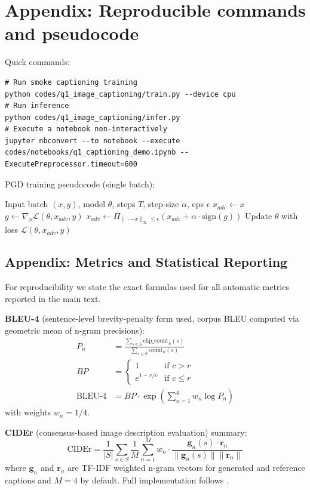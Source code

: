 \documentclass[conference]{IEEEtran}
\begin{document}
\section{Appendix: Reproducible commands and pseudocode}
Quick commands:
\begin{lstlisting}
# Run smoke captioning training
python codes/q1_image_captioning/train.py --device cpu
# Run inference
python codes/q1_image_captioning/infer.py
# Execute a notebook non-interactively
jupyter nbconvert --to notebook --execute codes/notebooks/q1_captioning_demo.ipynb --ExecutePreprocessor.timeout=600
\end{lstlisting}

PGD training pseudocode (single batch):
\begin{algorithm}
\caption{PGD adversarial training single-batch inner loop}
\begin{algorithmic}[1]
\State Input batch $(x,y)$, model $\theta$, steps $T$, step-size $\alpha$, eps $\epsilon$
\State $x_{adv} \leftarrow x$
  \State $g \leftarrow \nabla_x \mathcal{L}(\theta, x_{adv}, y)$
  \State $x_{adv} \leftarrow \Pi_{\|\cdot - x\|_\infty \le \epsilon}(x_{adv} + \alpha \cdot \mathrm{sign}(g))$
\EndFor
\State Update $\theta$ with loss $\mathcal{L}(\theta, x_{adv}, y)$
\end{algorithmic}
\end{algorithm}
%
\subsection{Appendix: Metrics and Statistical Reporting}\label{appendix:metrics}
For reproducibility we state the exact formulas used for all automatic metrics reported in the main text.

\textbf{BLEU-4} (sentence-level brevity-penalty form used, corpus BLEU computed via geometric mean of n-gram precisions):
\begin{align}
P_n &= \frac{\sum_{s\in S} \text{clip\_count}_n(s)}{\sum_{s\in S} \text{count}_n(s)} \\
BP &= \begin{cases} 1 & \text{if } c>r \\ e^{1-r/c} & \text{if } c \le r \end{cases} \\
\text{BLEU-4} &= BP \cdot \exp\left( \sum_{n=1}^4 w_n \log P_n \right)
\end{align}
with weights \(w_n = 1/4\).

\textbf{CIDEr} (consensus-based image description evaluation) summary:
\begin{equation}
\text{CIDEr} = \frac{1}{|S|} \sum_{s \in S} \frac{1}{M} \sum_{n=1}^{M} w_n \cdot \frac{\mathbf{g}_n(s)\cdot \mathbf{r}_n}{\|\mathbf{g}_n(s)\| \|\mathbf{r}_n\|}
\end{equation}
where \( \mathbf{g}_n \) and \( \mathbf{r}_n \) are TF-IDF weighted n-gram vectors for generated and reference captions and \(M=4\) by default. Full implementation follows \cite{vedantam2015cider}.
\end{document}
